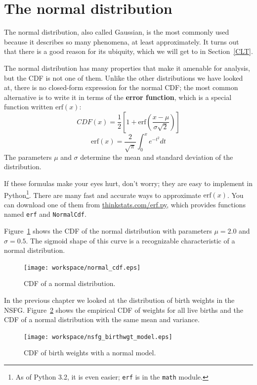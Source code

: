 \documentclass[12pt]{book}
\begin{document}
\section{The normal distribution}

\newcommand{\erf}{\mathrm{erf}}

The normal distribution, also called Gaussian, is the most commonly
used because it describes so many phenomena, at least approximately.
It turns out that there is a good reason for its ubiquity, which we
will get to in Section~\ref{CLT}.

The normal distribution has many properties that make it amenable for
analysis, but the CDF is not one of them.  Unlike the
other distributions we have looked at, there is no closed-form
expression for the normal CDF; the most common alternative is to write
it in terms of the {\bf error function}, which is a special function
written $\erf(x)$:
%
\[ CDF(x) = \frac{1}{2} \left[ 1 +
  \erf \left( \frac{x - \mu}{\sigma \sqrt{2}} \right) \right] \]
%
\[ \erf(x) = \frac{2}{\sqrt{\pi}} \int_{0}^x e^{-t^2} dt \]
%
The parameters $\mu$ and $\sigma$ determine the mean and standard
deviation of the distribution.

If these formulas make your eyes hurt, don't worry; they are easy to
implement in Python\footnote{As of Python 3.2, it is even easier; 
{\tt erf} is in the {\tt math} module.}.  There are many fast and
accurate ways to approximate $\erf(x)$.  You can download one of them
from \url{thinkstats.com/erf.py}, which provides functions named
{\tt erf} and {\tt NormalCdf}.

Figure~\ref{normal_cdf} shows the CDF of the normal distribution
with parameters $\mu=2.0$ and $\sigma=0.5$.  The sigmoid shape of
this curve is a recognizable characteristic of a normal distribution.

\begin{figure}
\centerline{\texttt{[image: workspace/normal\_cdf.eps]}}
\caption{CDF of a normal distribution.}
\label{normal_cdf}
\end{figure}

In the previous chapter we looked at the distribution of birth
weights in the NSFG.  Figure~\ref{nsfg_birthwgt_model} shows the
empirical CDF of weights for all live births and the CDF of
a normal distribution with the same mean and variance.

\begin{figure}
\centerline{\texttt{[image: workspace/nsfg\_birthwgt\_model.eps]}}
\caption{CDF of birth weights with a normal model.}
\label{nsfg_birthwgt_model}
\end{figure}
\end{document}
